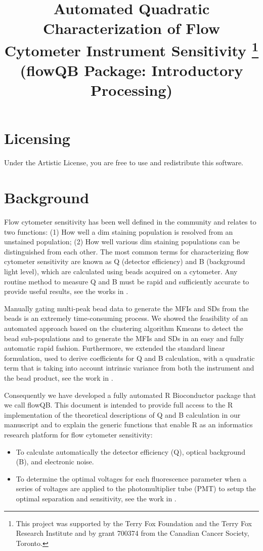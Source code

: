 \documentclass{article}
\begin{document}
\title{
Automated Quadratic Characterization of Flow Cytometer Instrument Sensitivity %
\footnote{This project was supported by the Terry Fox Foundation and the Terry Fox Research Institute and by grant 700374 from
the Canadian Cancer Society, Toronto.}  \\ (flowQB Package: Introductory Processing) 
} 
\maketitle

\section{Licensing}
Under the Artistic License, you are free to use and redistribute this software.

\section{Background}
\label{intro}
Flow cytometer sensitivity has been well defined in the community and relates to two functions: (1) How well a dim staining
population is resolved from an unstained population; (2) How well various dim staining populations can be distinguished from each other. 
The most common terms for characterizing flow cytometer sensitivity are known as Q (detector efficiency) and B (background light level), which are calculated using beads acquired on a cytometer. Any routine method to measure Q and B must be rapid and sufficiently accurate to provide useful results, see the works in \cite{wj,HW,CH}. 

Manually gating multi-peak bead data to generate the MFIs and SDs from the beads is an extremely time-consuming process. We showed the feasibility of an automated approach based on the clustering algorithm Kmeans to detect the bead sub-populations and to generate the MFIs and SDs in an easy and fully automatic rapid fashion. Furthermore, we extended the standard linear formulation, used to derive coefficients for Q and B calculation, with a quadratic term that is taking into account intrinsic variance from both the instrument and the bead product, see the work in \cite{f}. 

Consequently we have developed a fully automated R Bioconductor package that we call flowQB. This document is intended to provide full access to the R implementation of the theoretical descriptions of Q and B calculation in our manuscript \cite{f} and to explain the generic functions that enable R as an informatics research platform for flow cytometer sensitivity: 
\begin{itemize}
\item To calculate automatically the detector efficiency (Q), optical background (B), and electronic noise. 
\item To determine the optimal voltages for each fluorescence parameter when a series of voltages are applied to the photomultiplier tube (PMT) to setup the optimal separation and sensitivity, see the work in \cite{f}. 
\end{itemize}
\end{document}
